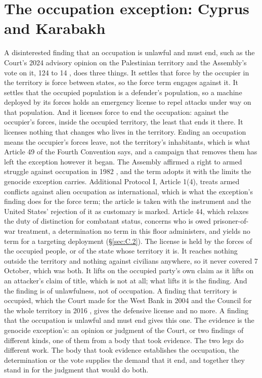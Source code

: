 \section{The occupation exception: Cyprus and Karabakh}
\label{sec:F.5}
A disinterested finding that an occupation is unlawful and must end, such as the Court's 2024 advisory opinion on the Palestinian territory \autocite{icj2024palestine} and the Assembly's vote on it, 124 to 14 \autocite{unga2024es1024}, does three things. It settles that force by the occupier in the territory is force between states, so the force term engages against it. It settles that the occupied population is a defender's population, so a machine deployed by its forces holds an emergency license to repel attacks under way on that population. And it licenses force to end the occupation: against the occupier's forces, inside the occupied territory, the least that ends it there. It licenses nothing that changes who lives in the territory. Ending an occupation means the occupier's forces leave, not the territory's inhabitants, which is what Article 49 of the Fourth Convention says, and a campaign that removes them has left the exception however it began. The Assembly affirmed a right to armed struggle against occupation in 1982 \autocite{unga1982res3743}, and the term adopts it with the limits the genocide exception carries. Additional Protocol I, Article 1(4), treats armed conflicts against alien occupation as international, which is what the exception's finding does for the force term; the article is taken with the instrument and the United States' rejection of it as customary is marked. Article 44, which relaxes the duty of distinction for combatant status, concerns who is owed prisoner-of-war treatment, a determination no term in this floor administers, and yields no term for a targeting deployment (\S\ref{sec:C.2}). The license is held by the forces of the occupied people, or of the state whose territory it is. It reaches nothing outside the territory and nothing against civilians anywhere, so it never covered 7 October, which was both. It lifts on the occupied party's own claim as it lifts on an attacker's claim of title, which is not at all; what lifts it is the finding. And the finding is of unlawfulness, not of occupation. A finding that territory is occupied, which the Court made for the West Bank in 2004 \autocite{icj2004wall} and the Council for the whole territory in 2016 \autocite{unsc2016res2334}, gives the defensive license and no more. A finding that the occupation is unlawful and must end gives this one. The evidence is the genocide exception's: an opinion or judgment of the Court, or two findings of different kinds, one of them from a body that took evidence. The two legs do different work. The body that took evidence establishes the occupation, the determination or the vote supplies the demand that it end, and together they stand in for the judgment that would do both.

